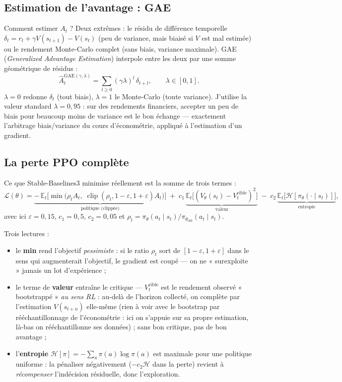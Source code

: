 \documentclass[11pt,a4paper]{article}
\begin{document}
\subsection{Estimation de l'avantage : GAE}
\label{app:gae}

Comment estimer $A_t$ ? Deux extrêmes : le résidu de différence temporelle
$\delta_t = r_t + \gamma V(s_{t+1}) - V(s_t)$ (peu de variance, mais biaisé si $V$ est
mal estimée) ou le rendement Monte-Carlo complet (sans biais, variance maximale). GAE
(\emph{Generalized Advantage Estimation}) interpole entre les deux par une somme
géométrique de résidus :
\[
\hat A_t^{\text{GAE}(\gamma, \lambda)} = \sum_{l \ge 0} (\gamma\lambda)^l\, \delta_{t+l},
\qquad \lambda \in [0, 1].
\]
$\lambda = 0$ redonne $\delta_t$ (tout biais), $\lambda = 1$ le Monte-Carlo (toute
variance). J'utilise la valeur standard $\lambda = 0{,}95$ : sur des rendements
financiers, accepter un peu de biais pour beaucoup moins de variance est le bon échange
--- exactement l'arbitrage biais/variance du cours d'économétrie, appliqué à
l'estimation d'un gradient.

\subsection{La perte PPO complète}
\label{app:ppo}

Ce que Stable-Baselines3 minimise réellement est la somme de trois termes :
\[
\mathcal{L}(\theta) =
\underbrace{-\,\mathbb{E}_t\Big[\min\big(\rho_t A_t,\;
\operatorname{clip}(\rho_t, 1-\varepsilon, 1+\varepsilon) A_t\big)\Big]}_{\text{politique (clippée)}}
\;+\; c_1\, \underbrace{\mathbb{E}_t\big[(V_\theta(s_t) - V_t^{\text{cible}})^2\big]}_{\text{valeur}}
\;-\; c_2\, \underbrace{\mathbb{E}_t\big[\mathcal{H}[\pi_\theta(\cdot \mid s_t)]\big]}_{\text{entropie}},
\]
avec ici $\varepsilon = 0{,}15$, $c_1 = 0{,}5$, $c_2 = 0{,}05$ et $\rho_t =
\pi_\theta(a_t \mid s_t) / \pi_{\theta_{\text{old}}}(a_t \mid s_t)$.

Trois lectures :
\begin{itemize}[itemsep=2pt]
  \item le \textbf{min} rend l'objectif \emph{pessimiste} : si le ratio $\rho_t$ sort
        de $[1-\varepsilon, 1+\varepsilon]$ dans le sens qui augmenterait l'objectif, le
        gradient est coupé --- on ne « surexploite » jamais un lot d'expérience ;
  \item le terme de \textbf{valeur} entraîne le critique --- $V_t^{\text{cible}}$ est
        le rendement observé « bootstrappé » \emph{au sens RL} : au-delà de l'horizon
        collecté, on complète par l'estimation $V(s_{t+n})$ elle-même (rien à voir
        avec le bootstrap par rééchantillonnage de l'économétrie : ici on s'appuie sur
        sa propre estimation, là-bas on rééchantillonne ses données) ; sans bon
        critique, pas de bon avantage ;
  \item l'\textbf{entropie} $\mathcal{H}[\pi] = -\sum_a \pi(a) \log \pi(a)$ est maximale
        pour une politique uniforme : la pénaliser négativement ($-c_2\mathcal{H}$
        dans la perte) revient à \emph{récompenser} l'indécision résiduelle, donc
        l'exploration.
\end{itemize}
\end{document}
